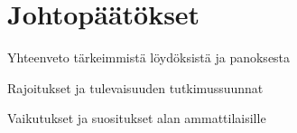 \chapter{Johtopäätökset} \label{Johtopäätökset}

Yhteenveto tärkeimmistä löydöksistä ja panoksesta

Rajoitukset ja tulevaisuuden tutkimussuunnat

Vaikutukset ja suositukset alan ammattilaisille

